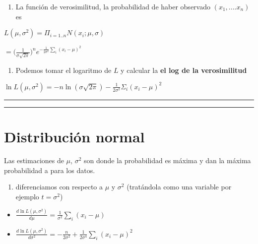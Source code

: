 \documentclass[
]{book}
\providecommand{\tightlist}{%
  \setlength{\itemsep}{0pt}\setlength{\parskip}{0pt}}
\begin{document}
\begin{enumerate}
\def\labelenumi{\arabic{enumi}.}
\tightlist
\item
  La función de verosimilitud, la probabilidad de haber observado \((x_1, ....x_n)\) es
\end{enumerate}

\(L(\mu, \sigma^2)=\Pi_{i=1..n} N(x_i;\mu,\sigma)\)

\(=\big( \frac{1}{\sigma \sqrt{2 \pi}}\big)^n e^{-\frac{1}{2\sigma^2} \sum_i(x_i-\mu)^ 2}\)

\begin{enumerate}
\def\labelenumi{\arabic{enumi}.}
\setcounter{enumi}{1}
\tightlist
\item
  Podemos tomar el logaritmo de \(L\) y calcular la \textbf{el log de la verosimilitud}
\end{enumerate}

\(\ln L(\mu, \sigma^2)=-n \ln(\sigma \sqrt{2 \pi})-\frac{1}{2\sigma^2} \Sigma_i(x_i-\mu) ^2\)

\begin{center}\rule{0.5\linewidth}{0.5pt}\end{center}

\begin{center}\rule{0.5\linewidth}{0.5pt}\end{center}

\hypertarget{distribuciuxf3n-normal-11}{%
\section{Distribución normal}\label{distribuciuxf3n-normal-11}}

Las estimaciones de \(\mu\), \(\sigma^2\) son donde la probabilidad es máxima y dan la máxima probabilidad a para los datos.

\begin{enumerate}
\def\labelenumi{\arabic{enumi}.}
\setcounter{enumi}{2}
\tightlist
\item
  diferenciamos con respecto a \(\mu\) y \(\sigma^2\) (tratándola como una variable por ejemplo \(t=\sigma^2\))
\end{enumerate}

\begin{itemize}
\item
  \(\frac{d \ln L(\mu, \sigma^2)}{d\mu}=\frac{1}{\sigma^2} \sum_i(x_i-\mu)\)
\item
  \(\frac{d \ln L(\mu, \sigma^2)}{d\sigma^2}=-\frac{n}{2 \sigma^2}+\frac{1}{2\sigma ^4} \sum_i(x_i-\mu)^2\)
\end{itemize}
\end{document}
